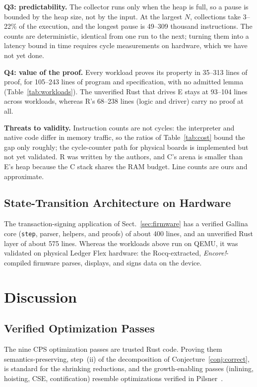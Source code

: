 \documentclass[runningheads]{llncs}
\newcommand{\encore}{\textit{Encore!}}
\newcommand{\code}[1]{\texttt{#1}}
\begin{document}
\textbf{Q3: predictability.}
The collector runs only when the heap is full, so a pause is bounded by the heap size, not by the input.
At the largest $N$, collections take 3--22\% of the execution, and the longest pause is 49--309 thousand instructions.
The counts are deterministic, identical from one run to the next; turning them into a latency bound in time requires cycle measurements on hardware, which we have not yet done.

\textbf{Q4: value of the proof.}
Every workload proves its property in 35--313 lines of proof, for 105--243 lines of program and specification, with no admitted lemma (Table~\ref{tab:workloads}).
The unverified Rust that drives E stays at 93--104 lines across workloads, whereas R's 68--238 lines (logic and driver) carry no proof at all.

\textbf{Threats to validity.}
Instruction counts are not cycles: the interpreter and native code differ in memory traffic, so the ratios of Table~\ref{tab:cost} bound the gap only roughly; the cycle-counter path for physical boards is implemented but not yet validated.
R was written by the authors, and C's arena is smaller than E's heap because the C stack shares the RAM budget.
Line counts are ours and approximate.

\subsection{State-Transition Architecture on Hardware}

The transaction-signing application of Sect.~\ref{sec:firmware} has a verified Gallina core (\code{step}, parser, helpers, and proofs) of about 400 lines, and an unverified Rust layer of about 575 lines.
Whereas the workloads above run on QEMU, it was validated on physical Ledger Flex hardware: the Rocq-extracted, \encore-compiled firmware parses, displays, and signs data on the device.

\section{Discussion}
\label{sec:discussion}

\subsection{Verified Optimization Passes}

The nine CPS optimization passes are trusted Rust code.
Proving them semantics-preserving, step~(ii) of the decomposition of Conjecture~\ref{conj:correct}, is standard for the shrinking reductions, and the growth-enabling passes (inlining, hoisting, CSE, contification) resemble optimizations verified in Pilsner~\cite{neis2015pilsner}.
\end{document}
